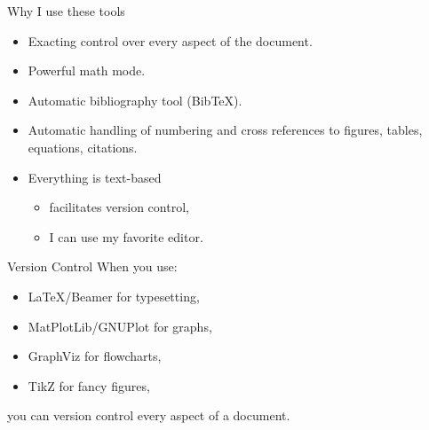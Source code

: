 \documentclass[12pt]{beamer}
\begin{document}
\begin{frame}{Why I use these tools}

\begin{itemize}
\item{Exacting control over every aspect of the document.}
\item{Powerful math mode.}
\item{Automatic bibliography tool (Bib\TeX).}
\item{Automatic handling of numbering and cross references to figures, tables, equations, citations.}
\item{Everything is text-based}
\begin{itemize}
\item{facilitates version control,}
\item{I can use my favorite editor.}
\end{itemize}
\end{itemize}
\end{frame}

\begin{frame}{Version Control}
When you use:
\begin{itemize}
\item \LaTeX/Beamer for typesetting,
\item MatPlotLib/GNUPlot for graphs,
\item GraphViz for flowcharts,
\item TikZ for fancy figures,
\end{itemize}

you can version control every aspect of a document.\\
\end{frame}

\end{document}
